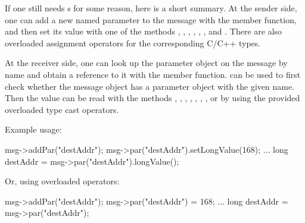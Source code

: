If one still needs s for some reason, here is a short summary.
At the sender side, one can add a new named parameter to the message
with the  member function, and then set its value with
one of the methods , ,
, , ,
, and . There are also overloaded
assignment operators for the corresponding C/C++ types.

At the receiver side, one can look up the parameter object on the message
by name and obtain a reference to it with the  member function.
 can be used to first check whether the message object has a parameter
object with the given name. Then the value can be read with the methods
, , ,
, , ,
, or by using the provided overloaded type cast operators.

Example usage:

\begin{cpp}
msg->addPar("destAddr");
msg->par("destAddr").setLongValue(168);
...
long destAddr = msg->par("destAddr").longValue();
\end{cpp}

Or, using overloaded operators:

\begin{cpp}
msg->addPar("destAddr");
msg->par("destAddr") = 168;
...
long destAddr = msg->par("destAddr");
\end{cpp}


